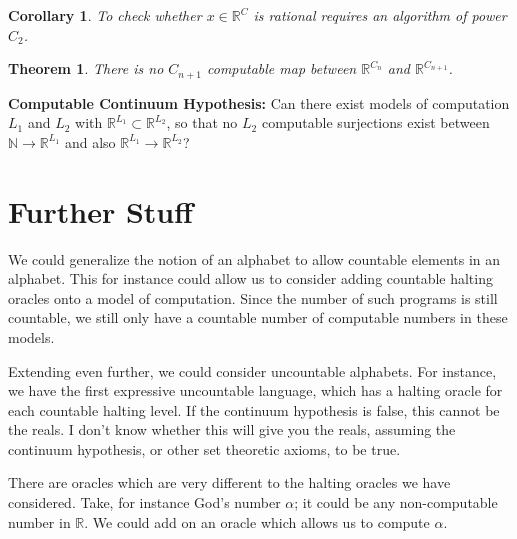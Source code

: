 \documentclass[11pt]{article}
\theoremstyle{plain}
\newtheorem{thm}[prop]{Theorem}
\newtheorem{cly}[prop]{Corollary}
\newcommand{\bb}[1]{\mathbb{#1}}
\newcommand{\bo}[1]{{\bf #1}}
\newcommand{\ra}{\rightarrow}
\newcommand{\ak}{\alpha}        \newcommand{\Ak}{\Alpha}
\begin{document}
\begin{cly}To check whether $x\in\bb R^C$ is rational requires an algorithm of power $C_2$. \end{cly}

\begin{thm}There is no $C_{n+1}$ computable map between $\bb R^{C_n}$ and $\bb R^{C_{n+1}}$.\end{thm}

\bo{Computable Continuum Hypothesis:} Can there exist models of computation $L_1$ and $L_2$ with $\bb R^{L_1}\subset\bb R^{L_2}$, so that no $L_2$ computable surjections exist between $\bb N\ra\bb R^{L_1}$ and also $\bb R^{L_1}\ra \bb R^{L_2}$?


\section{Further Stuff}
We could generalize the notion of an alphabet to allow countable elements in an alphabet. This for instance could allow us to consider adding countable halting oracles onto a model of 
computation. Since the number of such programs is still countable, we still only have a countable number of computable numbers in these models.

Extending even further, we could consider uncountable alphabets. For instance, we have the first expressive uncountable language, which has a halting oracle for each countable halting level. If the continuum hypothesis is false, this cannot be the reals. I don't know whether this will give you the reals, assuming the continuum hypothesis, or other set theoretic axioms, to be true.

There are oracles which are very different to the halting oracles we have considered. Take, for instance God's number $\ak$; it could be any non-computable number in $\bb R$. We could add on an oracle which allows us to compute $\ak$.
\end{document}
